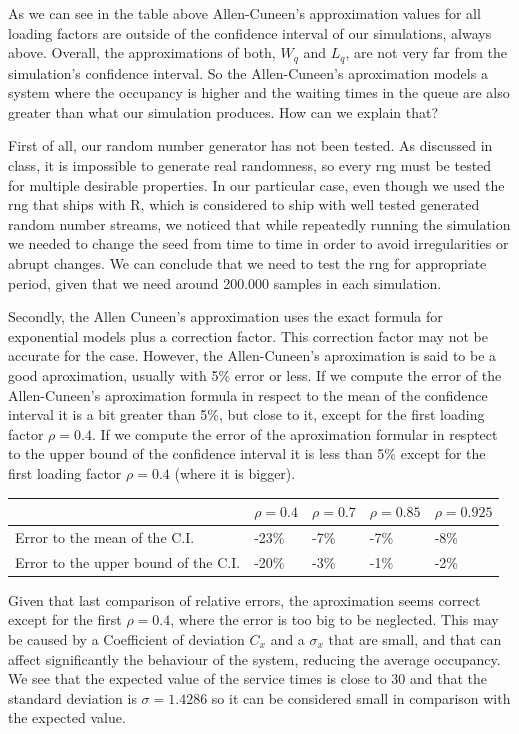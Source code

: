 \documentclass[]{article}
\begin{document}
As we can see in the table above Allen-Cuneen's approximation values for
all loading factors are outside of the confidence interval of our
simulations, always above. Overall, the approximations of both, \(W_q\)
and \(L_{q}\), are not very far from the simulation's confidence
interval. So the Allen-Cuneen's aproximation models a system where the
occupancy is higher and the waiting times in the queue are also greater
than what our simulation produces. How can we explain that?

First of all, our random number generator has not been tested. As
discussed in class, it is impossible to generate real randomness, so
every rng must be tested for multiple desirable properties. In our
particular case, even though we used the rng that ships with R, which is
considered to ship with well tested generated random number streams, we
noticed that while repeatedly running the simulation we needed to change
the seed from time to time in order to avoid irregularities or abrupt
changes. We can conclude that we need to test the rng for appropriate
period, given that we need around 200.000 samples in each simulation.

Secondly, the Allen Cuneen's approximation uses the exact formula for
exponential models plus a correction factor. This correction factor may
not be accurate for the case. However, the Allen-Cuneen's aproximation
is said to be a good aproximation, usually with 5\% error or less. If we
compute the error of the Allen-Cuneen's aproximation formula in respect
to the mean of the confidence interval it is a bit greater than 5\%, but
close to it, except for the first loading factor \(\rho=0.4\). If we
compute the error of the aproximation formular in resptect to the upper
bound of the confidence interval it is less than 5\% except for the
first loading factor \(\rho=0.4\) (where it is bigger).

\begin{longtable}[]{@{}lllll@{}}
\toprule
& \(\rho=0.4\) & \(\rho=0.7\) & \(\rho=0.85\) &
\(\rho=0.925\)\tabularnewline
\midrule
\endhead
Error to the mean of the C.I. & -23\% & -7\% & -7\% &
-8\%\tabularnewline
Error to the upper bound of the C.I. & -20\% & -3\% & -1\% &
-2\%\tabularnewline
\bottomrule
\end{longtable}

Given that last comparison of relative errors, the aproximation seems
correct except for the first \(\rho=0.4\), where the error is too big to
be neglected. This may be caused by a Coefficient of deviation \(C_{x}\)
and a \(\sigma_{x}\) that are small, and that can affect significantly
the behaviour of the system, reducing the average occupancy. We see that
the expected value of the service times is close to 30 and that the
standard deviation is \(\sigma=1.4286\) so it can be considered small in
comparison with the expected value.
\end{document}
